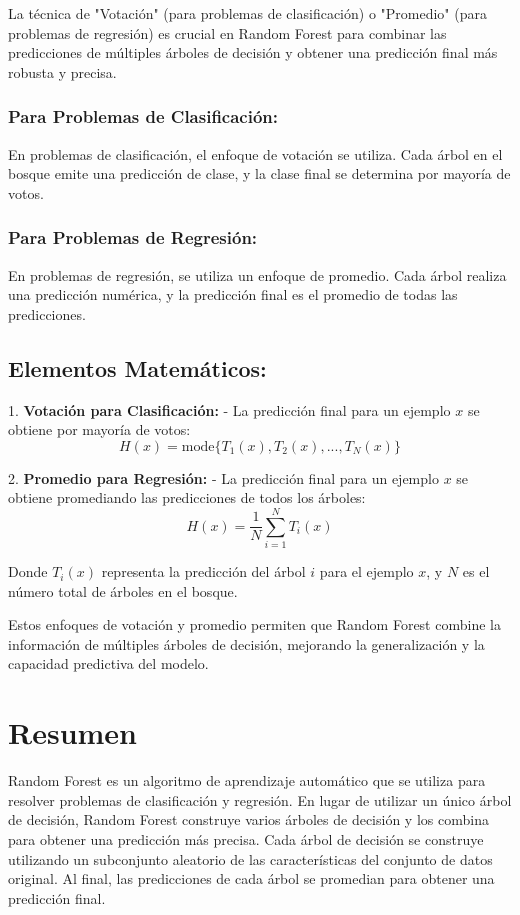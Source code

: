 \documentclass[12pt]{article}
\begin{document}
La técnica de "Votación" (para problemas de clasificación) o "Promedio" (para problemas de regresión) es crucial en Random Forest para combinar las predicciones de múltiples árboles de decisión y obtener una predicción final más robusta y precisa.

\subsubsection{Para Problemas de Clasificación:}

En problemas de clasificación, el enfoque de votación se utiliza. Cada árbol en el bosque emite una predicción de clase, y la clase final se determina por mayoría de votos.

\subsubsection{Para Problemas de Regresión:}

En problemas de regresión, se utiliza un enfoque de promedio. Cada árbol realiza una predicción numérica, y la predicción final es el promedio de todas las predicciones.

\subsection{Elementos Matemáticos:}

1. \textbf{Votación para Clasificación:}
    - La predicción final para un ejemplo \(x\) se obtiene por mayoría de votos:
        \[ H(x) = \textrm{mode}\{T_1(x), T_2(x), ..., T_N(x)\} \]

2. \textbf{Promedio para Regresión:}
    - La predicción final para un ejemplo \(x\) se obtiene promediando las predicciones de todos los árboles:
        \[ H(x) = \frac{1}{N}\sum_{i=1}^{N} T_i(x) \]

Donde \(T_i(x)\) representa la predicción del árbol \(i\) para el ejemplo \(x\), y \(N\) es el número total de árboles en el bosque.

Estos enfoques de votación y promedio permiten que Random Forest combine la información de múltiples árboles de decisión, mejorando la generalización y la capacidad predictiva del modelo.

\section{Resumen}

Random Forest es un algoritmo de aprendizaje automático que se utiliza para resolver problemas de clasificación y regresión. En lugar de utilizar un único árbol de decisión, Random Forest construye varios árboles de decisión y los combina para obtener una predicción más precisa. Cada árbol de decisión se construye utilizando un subconjunto aleatorio de las características del conjunto de datos original. Al final, las predicciones de cada árbol se promedian para obtener una predicción final.
\end{document}
